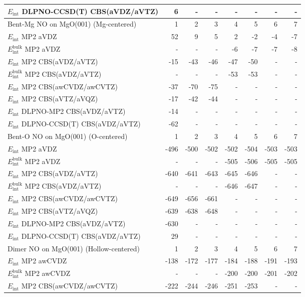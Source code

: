 \begin{longtable}{lrrrrrrr}
$E_\text{int}$ DLPNO-CCSD(T) CBS(aVDZ/aVTZ) & 6 & - & - & - & - & - & - \\
\toprule
Bent-Mg NO on MgO(001) (Mg-centered) & 1 & 2 & 3 & 4 & 5 & 6 & 7 \\ 
\midrule
$E_\text{int}$ MP2 aVDZ & 52 & 9 & 5 & 2 & -2 & -4 & -7 \\
$E_\text{int}^\text{bulk}$ MP2 aVDZ & - & - & - & -6 & -7 & -7 & -8 \\
$E_\text{int}$ MP2 CBS(aVDZ/aVTZ) & -15 & -43 & -46 & -47 & -50 & - & - \\
$E_\text{int}^\text{bulk}$ MP2 CBS(aVDZ/aVTZ) & - & - & - & -53 & -53 & - & - \\
$E_\text{int}$ MP2 CBS(awCVDZ/awCVTZ) & -37 & -70 & -75 & - & - & - & - \\
$E_\text{int}$ MP2 CBS(aVTZ/aVQZ) & -17 & -42 & -44 & - & - & - & - \\
$E_\text{int}$ DLPNO-MP2 CBS(aVDZ/aVTZ) & -14 & - & - & - & - & - & - \\
$E_\text{int}$ DLPNO-CCSD(T) CBS(aVDZ/aVTZ) & -62 & - & - & - & - & - & - \\
\toprule
Bent-O NO on MgO(001) (O-centered) & 1 & 2 & 3 & 4 & 5 & 6 & 7 \\ 
\midrule
$E_\text{int}$ MP2 aVDZ & -496 & -500 & -502 & -502 & -504 & -503 & -503 \\
$E_\text{int}^\text{bulk}$ MP2 aVDZ & - & - & - & -505 & -506 & -505 & -505 \\
$E_\text{int}$ MP2 CBS(aVDZ/aVTZ) & -640 & -641 & -643 & -645 & -646 & - & - \\
$E_\text{int}^\text{bulk}$ MP2 CBS(aVDZ/aVTZ) & - & - & - & -646 & -647 & - & - \\
$E_\text{int}$ MP2 CBS(awCVDZ/awCVTZ) & -649 & -656 & -661 & - & - & - & - \\
$E_\text{int}$ MP2 CBS(aVTZ/aVQZ) & -639 & -638 & -648 & - & - & - & - \\
$E_\text{int}$ DLPNO-MP2 CBS(aVDZ/aVTZ) & -630 & - & - & - & - & - & - \\
$E_\text{int}$ DLPNO-CCSD(T) CBS(aVDZ/aVTZ) & 29 & - & - & - & - & - & - \\
\toprule
Dimer NO on MgO(001) (Hollow-centered) & 1 & 2 & 3 & 4 & 5 & 6 & 7 \\ 
\midrule
$E_\text{int}$ MP2 awCVDZ & -138 & -172 & -177 & -184 & -188 & -191 & -193 \\
$E_\text{int}^\text{bulk}$ MP2 awCVDZ & - & - & - & -200 & -200 & -201 & -202 \\
$E_\text{int}$ MP2 CBS(awCVDZ/awCVTZ) & -222 & -244 & -246 & -251 & -253 & - & - \\

\end{longtable}
